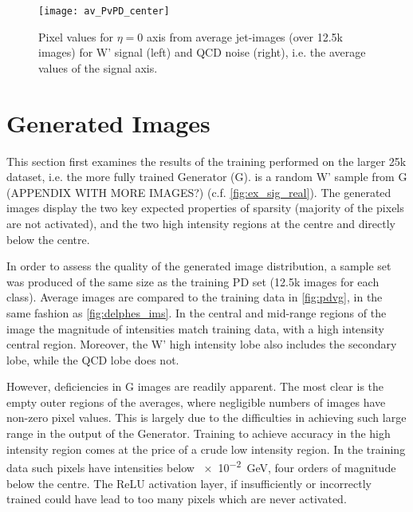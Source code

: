 \documentclass{report}
\newcommand{\around}{{\raise.17ex\hbox{$\scriptstyle\sim$}}}
\newcommand{\gev}{\giga\electronvolt}
\begin{document}
\begin{figure}[H]
	\centering
	\texttt{[image: av\_PvPD\_center]}
	
	\caption{Pixel values for $\eta=0$ axis from average jet-images (over 12.5k images)  for W' signal (left) and QCD noise (right), i.e. the average values of the signal axis.}
	\label{fig:delphes_middle}
	
\end{figure} 

\section{Generated Images}
\label{sec:genims}

This section first examines the results of the training performed on the larger 25k dataset, i.e. the more fully trained Generator (G).  is a random W' sample from G (APPENDIX WITH MORE IMAGES?) (c.f. \cref{fig:ex_sig_real}). The generated images display the two key expected properties of sparsity (majority of the pixels are not activated), and the two high intensity regions at the centre and directly below the centre.

In order to assess the quality of the generated image distribution, a sample set was produced of the same size as the training PD set (12.5k images for each class). Average images are compared to the training data in \cref{fig:pdvg}, in the same fashion as \cref{fig:delphes_ims}. In the central and mid-range regions of the image the magnitude of intensities match training data, with a high intensity central region. Moreover, the W' high intensity lobe also includes the secondary lobe, while the QCD lobe does not.

However, deficiencies in G images are readily apparent. The most clear is the empty outer regions of the averages, where negligible numbers of images have non-zero pixel values. This is largely due to the difficulties in achieving such large range in the output of the Generator. Training to achieve accuracy in the high intensity region comes at the price of a crude low intensity region. In the training data such pixels have intensities below \SI{e-2}{\gev}, four orders of magnitude below the centre. The ReLU activation layer, if insufficiently or incorrectly trained could have lead to too many pixels which are never activated.
\end{document}

